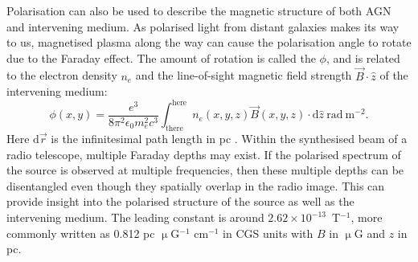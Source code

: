         Polarisation can also be used to describe the magnetic structure of both AGN and intervening medium. As polarised light from distant galaxies makes its way to us, magnetised plasma along the way can cause the polarisation angle to rotate due to the Faraday effect. The amount of rotation is called the  $\phi$, and is related to the electron density $n_e$ and the line-of-sight magnetic field strength $\vec B \cdot \hat{z}$ of the intervening medium:
        \begin{equation}
            \label{eq:faraday-depth}
            \phi(x, y) = \frac{e^3}{8\pi^2\epsilon_0m_e^2c^3} \int_{\mathrm{there}}^{\mathrm{here}} n_e(x, y, z) \vec B(x, y, z) \cdot \mathrm{d}\hat{z}\ \mathrm{rad}\ \mathrm{m}^{-2}.
        \end{equation}
        Here $\mathrm{d}\vec r$ is the infinitesimal path length in pc \citep{brentjens_faraday_2005} . Within the synthesised beam of a radio telescope, multiple Faraday depths may exist. If the polarised spectrum of the source is observed at multiple frequencies, then these multiple depths can be disentangled even though they spatially overlap in the radio image. This can provide insight into the polarised structure of the source as well as the intervening medium. The leading constant is around $2.62 \times 10^{-13}$~T$^{-1}$, more commonly written as 0.812 pc $\upmu$G$^{-1}$ cm$^{-1}$ in CGS units with $B$ in $\upmu$G and $z$ in pc.

